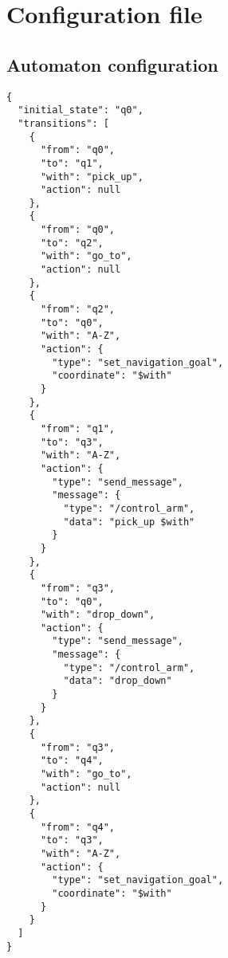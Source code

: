 \documentclass[../thesis.tex]{subfiles}
\begin{document}
\appendix
\chapter{Configuration file}
\section{Automaton configuration}\label{appendix:automaton_configuration_file}
\begin{lstlisting}[caption=JSON configuration file for the automaton]
{
  "initial_state": "q0",
  "transitions": [
    {
      "from": "q0",
      "to": "q1",
      "with": "pick_up",
      "action": null
    },
    {
      "from": "q0",
      "to": "q2",
      "with": "go_to",
      "action": null
    },
    {
      "from": "q2",
      "to": "q0",
      "with": "A-Z",
      "action": {
        "type": "set_navigation_goal",
        "coordinate": "$with"
      }
    },
    {
      "from": "q1",
      "to": "q3",
      "with": "A-Z",
      "action": {
        "type": "send_message",
        "message": {
          "type": "/control_arm",
          "data": "pick_up $with"
        }
      }
    },
    {
      "from": "q3",
      "to": "q0",
      "with": "drop_down",
      "action": {
        "type": "send_message",
        "message": {
          "type": "/control_arm",
          "data": "drop_down"
        }
      }
    },
    {
      "from": "q3",
      "to": "q4",
      "with": "go_to",
      "action": null
    },
    {
      "from": "q4",
      "to": "q3",
      "with": "A-Z",
      "action": {
        "type": "set_navigation_goal",
        "coordinate": "$with"
      }
    }
  ]
}
\end{lstlisting}
\end{document}
